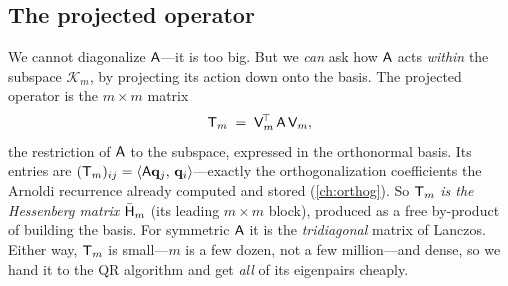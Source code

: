 \subsection{The projected operator}

We cannot diagonalize $\mathsf{A}$---it is too big. But we \emph{can} ask how $\mathsf{A}$
acts \emph{within} the subspace $\mathcal{K}_m$, by projecting its action down onto the
basis. The projected operator is the $m \times m$ matrix
\[
  \mathsf{T}_m \;=\; \mathsf{V}_m^{\!\top}\,\mathsf{A}\,\mathsf{V}_m,
\]
the restriction of $\mathsf{A}$ to the subspace, expressed in the orthonormal basis. Its
entries are $(\mathsf{T}_m)_{ij} = \left\langle \mathsf{A}\mathbf{q}_j,\, \mathbf{q}_i\right\rangle$---exactly the
orthogonalization coefficients the Arnoldi recurrence already computed and stored
(\cref{ch:orthog}). So $\mathsf{T}_m$ \emph{is the Hessenberg matrix} $\bar{\mathsf{H}}_m$
(its leading $m\times m$ block), produced as a free by-product of building the basis. For
symmetric $\mathsf{A}$ it is the \emph{tridiagonal} matrix of Lanczos. Either way, $\mathsf{T}_m$
is small---$m$ is a few dozen, not a few million---and dense, so we hand it to the QR
algorithm and get \emph{all} of its eigenpairs cheaply.

